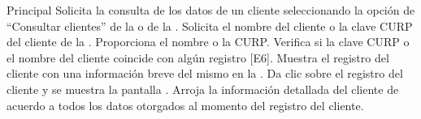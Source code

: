 	\begin{UCtrayectoria}{Principal}
		\UCpaso[\UCactor] Solicita la consulta de los datos de un cliente seleccionando la opción de ``Consultar clientes'' de la  o de la  .
		\UCpaso Solicita el nombre del cliente o la clave CURP del cliente de la .
		\UCpaso[\UCactor] Proporciona el nombre o la CURP.
		\UCpaso Verifica si la clave CURP o el nombre del cliente coincide con algún registro [E6].
		\UCpaso Muestra el registro del cliente con una información breve del mismo en la .
		\UCpaso[\UCactor] Da clic sobre el registro del cliente y se muestra la pantalla .
		\UCpaso Arroja la información detallada del cliente de acuerdo a todos los datos otorgados al momento del registro del cliente.
		
	\end{UCtrayectoria}
	

		

	